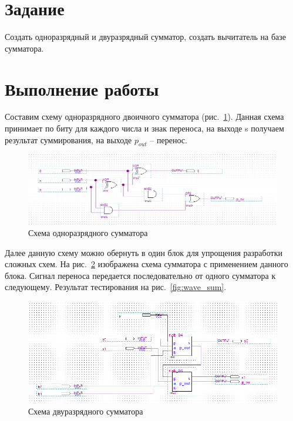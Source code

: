 \documentclass[a4paper,14pt]{article}
\begin{document}

\tableofcontents
\pagebreak

\section{Задание}

Создать одноразрядный и двуразрядный сумматор, создать вычитатель на базе сумматора.

\section{Выполнение работы}

Составим схему одноразрядного двоичного сумматора  (рис.~\ref{fig:baseline}).
Данная схема принимает по биту для каждого числа и знак переноса, на выходе s получаем результат суммирования, на выходе $p_{out}$ -- перенос.

\begin{figure}[H]
	\centering
	\includegraphics[width=\linewidth]{image/baseline}
	\caption{Схема одноразрядного сумматора}
	\label{fig:baseline}
\end{figure}

Далее данную схему можно обернуть в один блок для упрощения разработки сложных схем.
На рис.~\ref{fig:schema_sum} изображена схема сумматора с применением данного блока. 
Сигнал переноса передается последовательно от одного сумматора к следующему.
Результат тестирования на рис.~\ref{fig:wave_sum}.

\begin{figure}[H]
	\centering
	\includegraphics[width=\linewidth]{image/schema_sum}
	\caption{Схема двуразрядного сумматора}
	\label{fig:schema_sum}
\end{figure}
\end{document}
